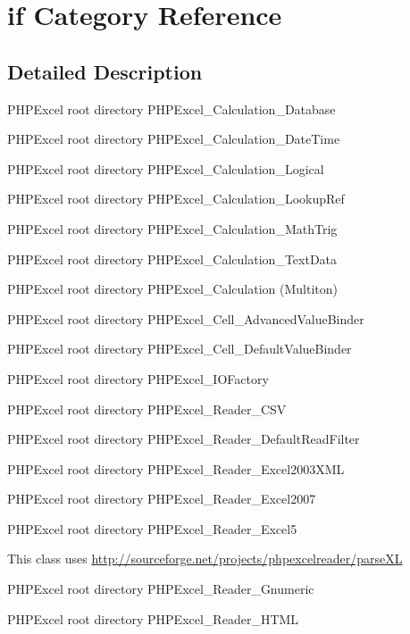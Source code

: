 \hypertarget{categoryif}{}\section{if Category Reference}
\label{categoryif}


\subsection{Detailed Description}
P\+H\+P\+Excel root directory P\+H\+P\+Excel\+\_\+\+Calculation\+\_\+\+Database

P\+H\+P\+Excel root directory P\+H\+P\+Excel\+\_\+\+Calculation\+\_\+\+Date\+Time

P\+H\+P\+Excel root directory P\+H\+P\+Excel\+\_\+\+Calculation\+\_\+\+Logical

P\+H\+P\+Excel root directory P\+H\+P\+Excel\+\_\+\+Calculation\+\_\+\+Lookup\+Ref

P\+H\+P\+Excel root directory P\+H\+P\+Excel\+\_\+\+Calculation\+\_\+\+Math\+Trig

P\+H\+P\+Excel root directory P\+H\+P\+Excel\+\_\+\+Calculation\+\_\+\+Text\+Data

P\+H\+P\+Excel root directory P\+H\+P\+Excel\+\_\+\+Calculation (Multiton)

P\+H\+P\+Excel root directory P\+H\+P\+Excel\+\_\+\+Cell\+\_\+\+Advanced\+Value\+Binder

P\+H\+P\+Excel root directory P\+H\+P\+Excel\+\_\+\+Cell\+\_\+\+Default\+Value\+Binder

P\+H\+P\+Excel root directory P\+H\+P\+Excel\+\_\+\+I\+O\+Factory

P\+H\+P\+Excel root directory P\+H\+P\+Excel\+\_\+\+Reader\+\_\+\+C\+SV

P\+H\+P\+Excel root directory P\+H\+P\+Excel\+\_\+\+Reader\+\_\+\+Default\+Read\+Filter

P\+H\+P\+Excel root directory P\+H\+P\+Excel\+\_\+\+Reader\+\_\+\+Excel2003\+X\+ML

P\+H\+P\+Excel root directory P\+H\+P\+Excel\+\_\+\+Reader\+\_\+\+Excel2007

P\+H\+P\+Excel root directory P\+H\+P\+Excel\+\_\+\+Reader\+\_\+\+Excel5

This class uses \hyperlink{}{http\+://sourceforge.\+net/projects/phpexcelreader/parse\+XL}

P\+H\+P\+Excel root directory P\+H\+P\+Excel\+\_\+\+Reader\+\_\+\+Gnumeric

P\+H\+P\+Excel root directory P\+H\+P\+Excel\+\_\+\+Reader\+\_\+\+H\+T\+ML

